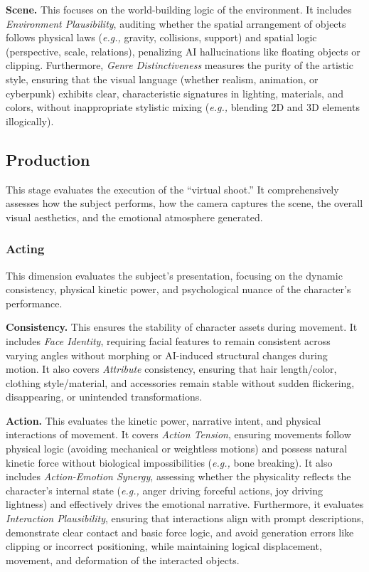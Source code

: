 \documentclass{article}
\begin{document}
\noindent
\textbf{Scene.} This focuses on the world-building logic of the environment. It includes \textit{Environment Plausibility}, auditing whether the spatial arrangement of objects follows physical laws (\textit{e.g.,} gravity, collisions, support) and spatial logic (perspective, scale, relations), penalizing AI hallucinations like floating objects or clipping. Furthermore, \textit{Genre Distinctiveness} measures the purity of the artistic style, ensuring that the visual language (whether realism, animation, or cyberpunk) exhibits clear, characteristic signatures in lighting, materials, and colors, without inappropriate stylistic mixing (\textit{e.g.,} blending 2D and 3D elements illogically).

\subsection{Production}
This stage evaluates the execution of the ``virtual shoot.'' It comprehensively assesses how the subject performs, how the camera captures the scene, the overall visual aesthetics, and the emotional atmosphere generated.

\subsubsection{Acting}
\noindent
This dimension evaluates the subject's presentation, focusing on the dynamic consistency, physical kinetic power, and psychological nuance of the character's performance.

\noindent
\textbf{Consistency.} This ensures the stability of character assets during movement. It includes \textit{Face Identity}, requiring facial features to remain consistent across varying angles without morphing or AI-induced structural changes during motion. It also covers \textit{Attribute} consistency, ensuring that hair length/color, clothing style/material, and accessories remain stable without sudden flickering, disappearing, or unintended transformations.

\noindent
\textbf{Action.} This evaluates the kinetic power, narrative intent, and physical interactions of movement. It covers \textit{Action Tension}, ensuring movements follow physical logic (avoiding mechanical or weightless motions) and possess natural kinetic force without biological impossibilities (\textit{e.g.,} bone breaking). It also includes \textit{Action-Emotion Synergy}, assessing whether the physicality reflects the character's internal state (\textit{e.g.,} anger driving forceful actions, joy driving lightness) and effectively drives the emotional narrative. Furthermore, it evaluates \textit{Interaction Plausibility}, ensuring that interactions align with prompt descriptions, demonstrate clear contact and basic force logic, and avoid generation errors like clipping or incorrect positioning, while maintaining logical displacement, movement, and deformation of the interacted objects.
\end{document}
